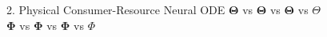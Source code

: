 \documentclass[final]{beamer}
\begin{document}
\begin{frame}
\begin{block}{2. Physical Consumer-Resource Neural ODE}
$\mathbf{\Theta}$ vs $\bm{\Theta}$ vs $\boldsymbol{\Theta}$ vs $\Theta$ \\
$\mathbf{\Phi}$ vs $\bm{\Phi}$ vs $\boldsymbol{\Phi}$ vs $\Phi$
\end{block}
\end{frame}
\end{document}
